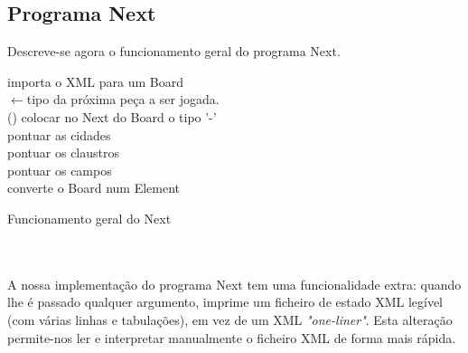\documentclass[11pt, a4paper, twoside]{article}
\begin{document}
\newpage
\subsection{Programa Next}
Descreve-se agora o funcionamento geral do programa Next.\\

\begin{algorithm}[H]
  
  \BlankLine
  importa o XML para um Board\\
  \TipoCerto$\leftarrow$tipo da próxima peça a ser jogada.\\

  \BlankLine
  (){
    colocar no Next do Board o tipo '-'\\
    pontuar as cidades\\
    pontuar os claustros\\
    pontuar os campos\\
    converte o Board num Element\\
  }
  
  \BlankLine
  \caption{Funcionamento geral do Next}
\end{algorithm}
\ \\
\ \\
A nossa implementação do programa Next tem uma funcionalidade extra: quando lhe é passado qualquer argumento, imprime um ficheiro de estado XML legível (com várias linhas e tabulações), em vez de um XML \emph{"one-liner"}. Esta alteração permite-nos ler e interpretar manualmente o ficheiro XML de forma mais rápida.
\end{document}
